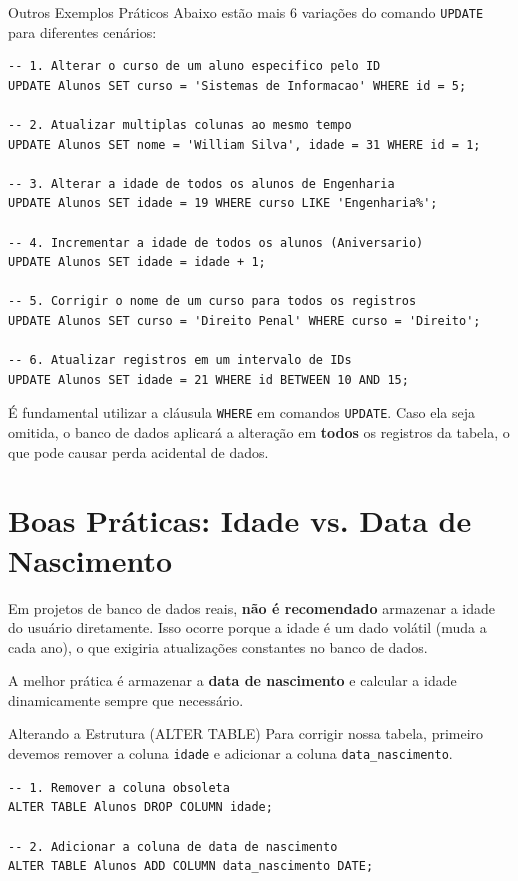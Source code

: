 \documentclass[12pt]{article}
\begin{document}
\begin{block}{Outros Exemplos Práticos}
Abaixo estão mais 6 variações do comando \texttt{UPDATE} para diferentes cenários:

\begin{lstlisting}
-- 1. Alterar o curso de um aluno especifico pelo ID
UPDATE Alunos SET curso = 'Sistemas de Informacao' WHERE id = 5;

-- 2. Atualizar multiplas colunas ao mesmo tempo
UPDATE Alunos SET nome = 'William Silva', idade = 31 WHERE id = 1;

-- 3. Alterar a idade de todos os alunos de Engenharia
UPDATE Alunos SET idade = 19 WHERE curso LIKE 'Engenharia%';

-- 4. Incrementar a idade de todos os alunos (Aniversario)
UPDATE Alunos SET idade = idade + 1;

-- 5. Corrigir o nome de um curso para todos os registros
UPDATE Alunos SET curso = 'Direito Penal' WHERE curso = 'Direito';

-- 6. Atualizar registros em um intervalo de IDs
UPDATE Alunos SET idade = 21 WHERE id BETWEEN 10 AND 15;
\end{lstlisting}
\end{block}

\begin{atencao}
É fundamental utilizar a cláusula \texttt{WHERE} em comandos \texttt{UPDATE}. Caso ela seja omitida, o banco de dados aplicará a alteração em \textbf{todos} os registros da tabela, o que pode causar perda acidental de dados.
\end{atencao}
\section{Boas Práticas: Idade vs. Data de Nascimento}

Em projetos de banco de dados reais, \textbf{não é recomendado} armazenar a idade do usuário diretamente. Isso ocorre porque a idade é um dado volátil (muda a cada ano), o que exigiria atualizações constantes no banco de dados.

A melhor prática é armazenar a \textbf{data de nascimento} e calcular a idade dinamicamente sempre que necessário.

\begin{block}{Alterando a Estrutura (ALTER TABLE)}
Para corrigir nossa tabela, primeiro devemos remover a coluna \texttt{idade} e adicionar a coluna \texttt{data\_nascimento}.

\begin{lstlisting}
-- 1. Remover a coluna obsoleta
ALTER TABLE Alunos DROP COLUMN idade;

-- 2. Adicionar a coluna de data de nascimento
ALTER TABLE Alunos ADD COLUMN data_nascimento DATE;
\end{lstlisting}
\end{block}
\end{document}
